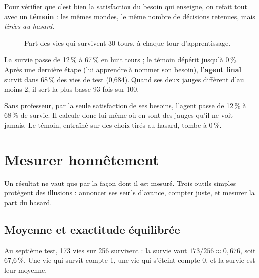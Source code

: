 \documentclass[fontsize=10pt,paper=a4,parskip=half-]{scrartcl}
\newcommand{\lead}[1]{{\fontsize{12}{16.5}\selectfont\color{ink!85!black}#1\par}\vspace{0.3em}}
\newcommand{\pc}{\,\%}
\begin{document}
Pour vérifier que c'est bien la satisfaction du besoin qui enseigne, on refait tout avec
un \textbf{témoin} : les mêmes mondes, le même nombre de décisions retenues, mais
\emph{tirées au hasard}.

\begin{figure}[h]
\centering
{}
\caption{Part des vies qui survivent 30 tours, à chaque tour d'apprentissage.}
\label{fig:survie}
\end{figure}

La survie passe de 12\pc{} à 67\pc{} en huit tours ; le témoin dépérit jusqu'à 0\pc.
Après une dernière étape (lui apprendre à nommer son besoin), l'\textbf{agent final}
survit dans 68\pc{} des vies de test (0,684). Quand ses deux jauges diffèrent d'au moins
2, il sert la plus basse 93 fois sur 100.

\begin{essentiel}
Sans professeur, par la seule satisfaction de ses besoins, l'agent passe de 12\pc{} à
68\pc{} de survie. Il calcule donc lui-même où en sont des jauges qu'il ne voit jamais.
Le témoin, entraîné sur des choix tirés au hasard, tombe à 0\pc.
\end{essentiel}

\section{Mesurer honnêtement}
\label{sec:mesurer}

\lead{Un résultat ne vaut que par la façon dont il est mesuré. Trois outils simples
protègent des illusions : annoncer ses seuils d'avance, compter juste, et mesurer la part
du hasard.}

\subsection{Moyenne et exactitude équilibrée}
Au septième test, 173 vies sur 256 survivent : la survie vaut $173/256 \approx 0,676$,
soit 67,6\pc. Une vie qui survit compte 1, une vie qui s'éteint compte 0, et la survie
est leur moyenne.
\end{document}
